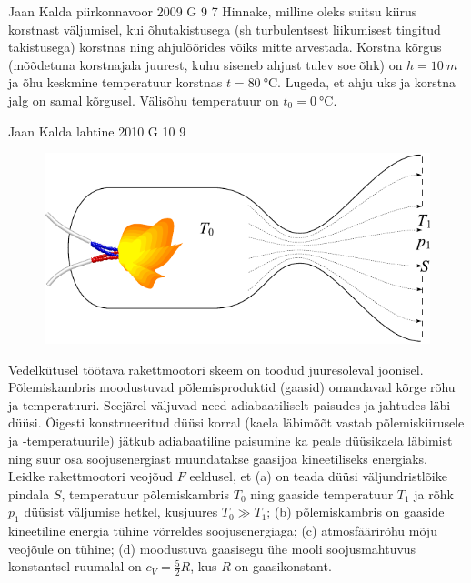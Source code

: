 \documentclass[11pt]{article}
\begin{document}
{%
{Jaan Kalda} %
{piirkonnavoor} %
{2009} %
{G 9} %
{7} %
{
\ifStatement
Hinnake, milline oleks suitsu kiirus korstnast väljumisel, kui õhutakistusega (sh turbulentsest liikumisest tingitud takistusega) korstnas ning ahjulõõrides võiks mitte arvestada.
Korstna kõrgus (mõõdetuna korstnajala juurest, kuhu siseneb ahjust tulev soe õhk) on $h=\SI{10}{m}$ ja õhu keskmine temperatuur korstnas $t=\SI{80}{\celsius}$. Lugeda, et ahju uks ja korstna jalg on samal kõrgusel. Välisõhu temperatuur on $t_0=\SI{0}{\celsius}$.
\fi
}

{Jaan Kalda} %
{lahtine} %
{2010} %
{G 10} %
{9} %
{
\ifStatement
\begin{figure}
	\vspace{-3ex}
	\includegraphics[width=\linewidth]{2010-lahg-10-rakettmootor}
	\vspace{-6ex}
\end{figure}
Vedelkütusel töötava rakettmootori skeem on toodud juuresoleval joonisel. Põlemiskambris moodustuvad põlemisproduktid (gaasid) omandavad kõrge rõhu ja temperatuuri. Seejärel väljuvad need adiabaatiliselt paisudes ja jahtudes läbi düüsi. Õigesti konstrueeritud düüsi korral (kaela läbimõõt vastab põlemiskiirusele ja -temperatuurile) jätkub adiabaatiline paisumine ka peale düüsikaela läbimist ning suur osa soojusenergiast muundatakse gaasijoa kineetiliseks energiaks. Leidke rakettmootori veojõud $F$ eeldusel, et (a) on teada düüsi väljundristlõike pindala $S$, temperatuur põlemiskambris $T_0$ ning gaaside temperatuur $T_1$ ja rõhk $p_1$ düüsist väljumise hetkel, kusjuures $T_0 \gg T_1$; (b) põlemiskambris on gaaside kineetiline energia tühine võrreldes soojusenergiaga; (c) atmosfäärirõhu mõju veojõule on tühine; (d) moodustuva gaasisegu ühe mooli soojusmahtuvus konstantsel ruumalal on $c_V = \frac52 R$, kus $R$ on gaasikonstant.
\fi
}
\newpage\subsection{\protect{}}

}
\end{document}
